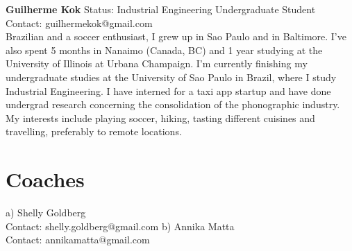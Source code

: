 \textbf{Guilherme Kok}
Status: Industrial Engineering Undergraduate Student \\
Contact: guilhermekok@gmail.com \\
Brazilian and a soccer enthusiast, I grew up in Sao Paulo and in Baltimore. I’ve also spent 5 months in Nanaimo (Canada, BC) and 1 year studying at the University of Illinois at Urbana Champaign. I’m currently finishing my undergraduate studies at the University of Sao Paulo in Brazil, where I study Industrial Engineering. I have interned for a taxi app startup and have done undergrad research concerning the consolidation of the phonographic industry. My interests include playing soccer, hiking, tasting different cuisines and travelling, preferably to remote locations. 

\section{Coaches}
a) Shelly Goldberg \\
Contact: shelly.goldberg@gmail.com
b) Annika Matta \\
Contact: annikamatta@gmail.com

